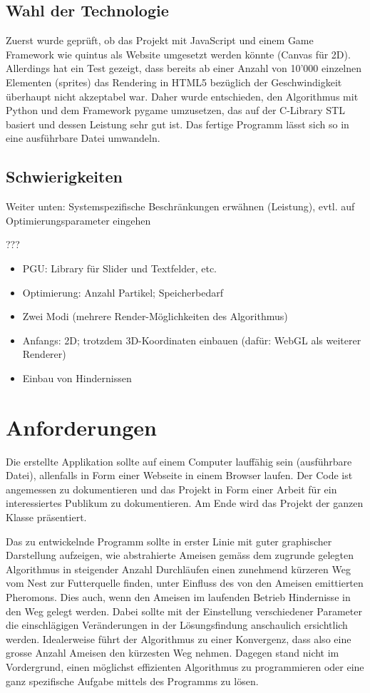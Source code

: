 \subsection{Wahl der Technologie}

Zuerst wurde geprüft, ob das Projekt mit JavaScript und einem Game Framework wie quintus als Website umgesetzt werden könnte (Canvas für 2D). Allerdings hat ein Test gezeigt, dass bereits ab einer Anzahl von 10'000 einzelnen Elementen (sprites) das Rendering in HTML5 bezüglich der Geschwindigkeit überhaupt nicht akzeptabel war. Daher wurde entschieden, den Algorithmus mit Python und dem Framework pygame umzusetzen, das auf der C-Library STL basiert und dessen Leistung sehr gut ist. Das fertige Programm lässt sich so in eine ausführbare Datei umwandeln.

\subsection{Schwierigkeiten}

Weiter unten: Systemspezifische Beschränkungen erwähnen (Leistung), evtl. auf Optimierungsparameter eingehen

???
\begin{itemize}[noitemsep]
\item PGU: Library für Slider und Textfelder, etc.
\item Optimierung: Anzahl Partikel; Speicherbedarf
\item Zwei Modi (mehrere Render-Möglichkeiten des Algorithmus)
\item Anfangs: 2D; trotzdem 3D-Koordinaten einbauen (dafür: WebGL als weiterer Renderer)
\item Einbau von Hindernissen
\end{itemize}




\section{Anforderungen}

Die erstellte Applikation sollte auf einem Computer lauffähig sein (ausführbare Datei), allenfalls in Form einer Webseite in einem Browser laufen. Der Code ist angemessen zu dokumentieren und das Projekt in Form einer Arbeit für ein interessiertes Publikum zu dokumentieren. Am Ende wird das Projekt der ganzen Klasse präsentiert.

Das zu entwickelnde Programm sollte in erster Linie mit guter graphischer Darstellung aufzeigen, wie abstrahierte Ameisen gemäss dem zugrunde gelegten Algorithmus in steigender Anzahl Durchläufen einen zunehmend kürzeren Weg vom Nest zur Futterquelle finden, unter Einfluss des von den Ameisen emittierten Pheromons. Dies auch, wenn den Ameisen im laufenden Betrieb Hindernisse in den Weg gelegt werden. Dabei sollte mit der Einstellung verschiedener Parameter die einschlägigen Veränderungen in der Lösungsfindung anschaulich ersichtlich werden. Idealerweise führt der Algorithmus zu einer Konvergenz, dass also eine grosse Anzahl Ameisen den kürzesten Weg nehmen. Dagegen stand nicht im Vordergrund, einen möglichst effizienten Algorithmus zu programmieren oder eine ganz spezifische Aufgabe mittels des Programms zu lösen.

